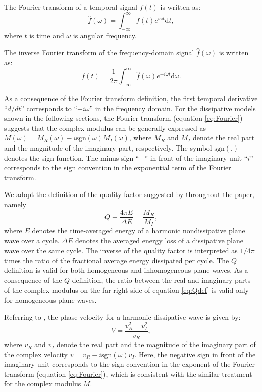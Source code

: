 \documentclass[article]{./macros/elsarticle_qh}
\begin{document}
The Fourier transform of a temporal signal $f(t)$ is written as:
\begin{equation} \label{eq:Fourier}
\hat{f}(\omega) = 
                  \int_{-\infty}^{\infty} 
                  f(t) e^{i \omega t}
                  \text{d}t ,
\end{equation}
where $t$ is time and $\omega$ is angular frequency.

The inverse Fourier transform of the frequency-domain signal $\hat{f}(\omega)$ is written as:
\begin{equation} \label{eq:invFourier}
f(t) = \frac{1}{2\pi} 
       \int_{-\infty}^{\infty} 
       \hat{f}(\omega) 
       e^{- i \omega t}
       \text{d}\omega .
\end{equation}

As a consequence of the Fourier transform definition, the first temporal derivative ``$d/dt$'' corresponds to ``$-i\omega$'' in 
the frequency domain. 
For the dissipative models shown in the following sections, the Fourier transform (equation \ref{eq:Fourier}) suggests that the complex modulus can be generally expressed as $M(\omega) = M_{R}(\omega) - i \text{sgn}(\omega) M_{I}(\omega)$, where $M_{R}$ and $M_{I}$ denote the real part and the magnitude of the imaginary part, respectively. The symbol $\text{sgn}(.)$ denotes the sign function. The minus sign ``$-$'' in front of the imaginary unit ``$i$'' corresponds to the sign convention in the exponential term of the Fourier transform.       

We adopt the definition of the quality factor suggested by \cite{connell:1978} throughout the paper, namely
\begin{equation} \label{eq:Qdef}
Q \equiv \frac{4\pi E}{\Delta E} = \frac{M_{R}}{M_{I}} ,
\end{equation}
where $E$ denotes the time-averaged energy of a harmonic nondissipative plane wave over a cycle. $\Delta E$ denotes the averaged energy loss of a dissipative plane wave over the same cycle. The inverse of the quality factor is interpreted as $1/4\pi$ times the ratio of the fractional average energy dissipated per cycle. The $Q$ definition is valid for both homogeneous and inhomogeneous plane waves. As a consequence of the $Q$ definition, the ratio between the real and imaginary parts of the complex modulus on the far right side of equation \ref{eq:Qdef} is valid only for homogeneous plane waves. 

Referring to \cite{knopoff:1964,knopoff:1965}, the phase velocity for a harmonic dissipative wave is given by:
\begin{equation} \label{eq:Vdef}
V = \frac{v_{R}^2 + v_{I}^2}{v_{R}} ,
\end{equation}
where $v_{R}$ and $v_{I}$ denote the real part and the magnitude of the imaginary part of the complex velocity $v = v_{R} - i\text{sgn}(\omega) v_{I}$. Here, the negative sign in front of the imaginary unit corresponds to the sign convention in the exponent of the Fourier transform (equation \ref{eq:Fourier}), which is consistent with the similar treatment for the complex modulus $M$. 
\end{document}
